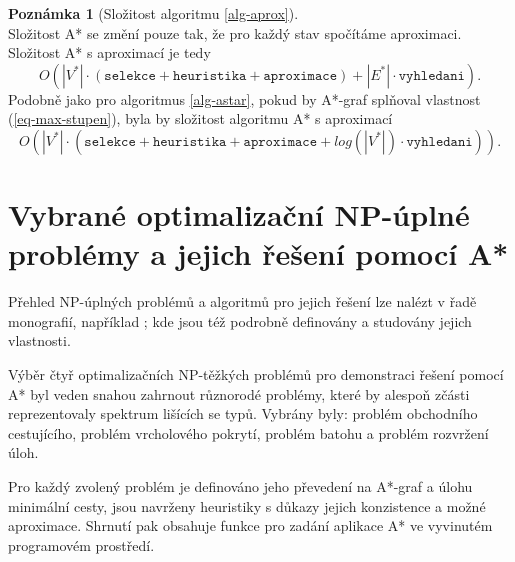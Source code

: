 \documentclass[12pt,notitlepage,fleqn]{report} %
\theoremstyle{definition}
\newtheorem{defin}[veta]{Definice}
\newtheorem{pozn}[veta]{Poznámka}
\newcommand{\thmpozn}[2]{\begin{pozn}[#1] \n #2 \end{pozn}}
\newcommand{\thmpoznone}[1]{\begin{pozn} \n #1 \end{pozn}}
\def\ent{$\:$}
\def\n{\ent \\}
\newcommand{\code}[1]{\texttt{#1}}
\begin{document}
    \thmpozn{Složitost algoritmu \ref{alg-aprox}}{
    Složitost A* se změní pouze tak, že pro každý stav spočítáme aproximaci.
    Složitost A* s aproximací je tedy 
\[ O(|V^*| \cdot (\code{selekce} + \code{heuristika} + \code{aproximace}) + |E^*| \cdot \code{vyhledani}). \]
    Podobně jako pro algoritmus \ref{alg-astar}, pokud by A*-graf splňoval vlastnost (\ref{eq-max-stupen}), byla by složitost algoritmu A* s aproximací 
\[ O(|V^*| \cdot (\code{selekce} + \code{heuristika} + \code{aproximace} +  log(|V^*|) \cdot \code{vyhledani})). \]
}
    
%      

\chapter{Vybrané optimalizační NP-úplné problémy a jejich řešení pomocí A*}
   


  Přehled NP-úplných problémů a algoritmů pro jejich řešení lze nalézt v řadě monografií, například \cite{np, algorithms, aprox, garey, korte}; kde jsou též podrobně definovány a studovány jejich vlastnosti.
    
  Výběr čtyř optimalizačních NP-těžkých problémů pro demonstraci řešení pomocí A* byl veden snahou zahrnout různorodé problémy, které by alespoň zčásti reprezentovaly spektrum lišících se typů. Vybrány byly: problém obchodního cestujícího, problém vrcholového pokrytí, problém batohu a problém rozvržení úloh.
  
  Pro každý zvolený problém je definováno jeho převedení na A*-graf a úlohu minimální cesty, jsou navrženy heuristiky s důkazy jejich konzistence a možné aproximace. Shrnutí pak obsahuje funkce pro zadání aplikace A* ve vyvinutém programovém prostředí.
  
\end{document}
